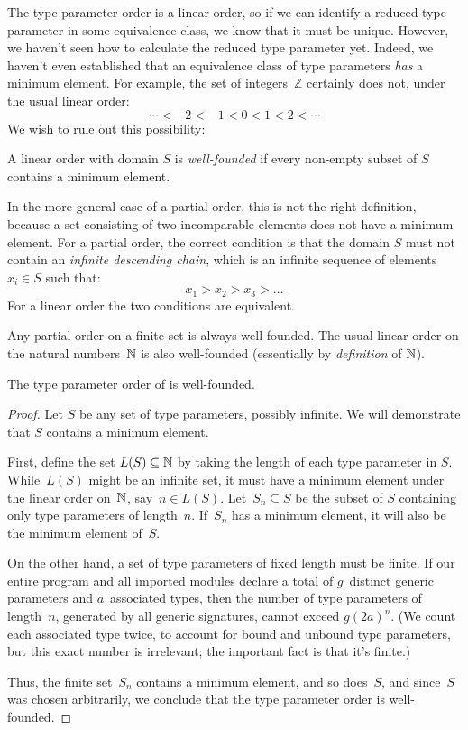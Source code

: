 \documentclass[../generics]{subfiles}
\begin{document}
The type parameter order is a linear order, so if we can identify a reduced type parameter in some equivalence class, we know that it must be unique. However, we haven't seen how to calculate the reduced type parameter yet. Indeed, we haven't even established that an equivalence class of type parameters \emph{has} a minimum element. For example, the set of integers~$\mathbb{Z}$ certainly does not, under the usual linear order:
\[\cdots < -2 < -1 < 0 < 1 < 2 < \cdots\]
We wish to rule out this possibility:
\begin{definition}\label{well founded def}
A linear order with domain $S$ is \emph{well-founded} if every non-empty subset of $S$ contains a minimum element.

In the more general case of a partial order, this is not the right definition, because a set consisting of two incomparable elements does not have a minimum element. For a partial order, the correct condition is that the domain $S$ must not contain an \emph{infinite descending chain}, which is an infinite sequence of elements $x_i\in S$ such that:
\[x_1 > x_2 > x_3 > \ldots \]
For a linear order the two conditions are equivalent.
\end{definition}

Any partial order on a finite set is always well-founded. The usual linear order on the natural numbers~$\mathbb{N}$ is also well-founded (essentially by \emph{definition} of $\mathbb{N}$).

\begin{proposition}\label{well founded type order} The type parameter order of  is well-founded.
\end{proposition}
\begin{proof}
Let $S$ be any set of type parameters, possibly infinite. We will demonstrate that $S$ contains a minimum element.

First, define the set $L(S)\subseteq\mathbb{N}$ by taking the length of each type parameter in $S$. While~$L(S)$ might be an infinite set, it must have a minimum element under the linear order on~$\mathbb{N}$, say~$n\in L(S)$. Let~$S_n\subseteq S$ be the subset of $S$ containing only type parameters of length~$n$. If~$S_n$ has a minimum element, it will also be the minimum element of~$S$.

On the other hand, a set of type parameters of fixed length must be finite. If our entire program and all imported modules declare a total of $g$~distinct generic parameters and $a$~associated types, then the number of type parameters of length~$n$, generated by all generic signatures, cannot exceed $g(2a)^n$. (We count each associated type twice, to account for bound and unbound type parameters, but this exact number is irrelevant; the important fact is that it's finite.)

Thus, the finite set~$S_n$ contains a minimum element, and so does~$S$, and since~$S$ was chosen arbitrarily, we conclude that the type parameter order is well-founded.
\end{proof}
\end{document}
